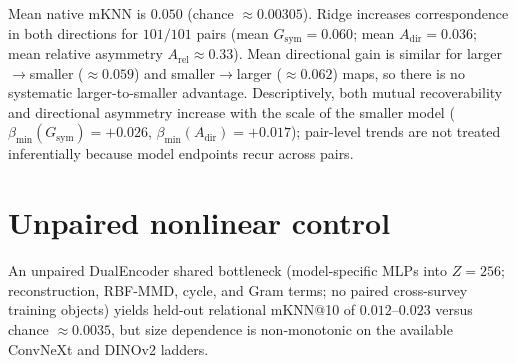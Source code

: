 \documentclass{article}
\begin{document}
Mean native mKNN is \(0.050\) (chance \(\approx0.00305\)).
Ridge increases correspondence in both directions for \(101/101\) pairs (mean \(G_{\mathrm{sym}}{=}0.060\); mean \(A_{\mathrm{dir}}{=}0.036\); mean relative asymmetry \(A_{\mathrm{rel}}{\approx}0.33\)).
Mean directional gain is similar for larger\(\to\)smaller (\(\approx0.059\)) and smaller\(\to\)larger (\(\approx0.062\)) maps, so there is no systematic larger-to-smaller advantage.
Descriptively, both mutual recoverability and directional asymmetry increase with the scale of the smaller model (\(\beta_{\min}(G_{\mathrm{sym}}){=}{+}0.026\), \(\beta_{\min}(A_{\mathrm{dir}}){=}{+}0.017\)); pair-level trends are not treated inferentially because model endpoints recur across pairs.

\section{Unpaired nonlinear control}\label{app:unpaired}

An unpaired DualEncoder shared bottleneck (model-specific MLPs into \(Z{=}256\); reconstruction, RBF-MMD, cycle, and Gram terms; no paired cross-survey training objects) yields held-out relational mKNN@10 of \(0.012\)--\(0.023\) versus chance \(\approx0.0035\), but size dependence is non-monotonic on the available ConvNeXt and DINOv2 ladders.
\end{document}
